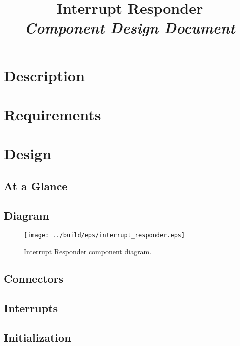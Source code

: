 



\title{\textbf{Interrupt Responder} \\
\large\textit{Component Design Document}}
\date{}
\maketitle

\section{Description}


\section{Requirements}


\section{Design}

\subsection{At a Glance}


\subsection{Diagram}
\begin{figure}[H]
  \texttt{[image: ../build/eps/interrupt\_responder.eps]}
  \caption{Interrupt Responder component diagram.}
\end{figure}

\subsection{Connectors}


\subsection{Interrupts}



\subsection{Initialization}


